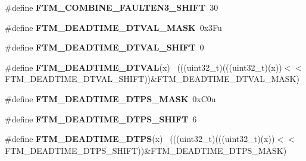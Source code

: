 \begin{DoxyCompactItemize}
\item 
\hypertarget{group___f_t_m___register___masks_ga85e6b9e11f73ef2ae12870399dbc99a6}{}\#define {\bfseries F\+T\+M\+\_\+\+C\+O\+M\+B\+I\+N\+E\+\_\+\+F\+A\+U\+L\+T\+E\+N3\+\_\+\+S\+H\+I\+F\+T}~30\label{group___f_t_m___register___masks_ga85e6b9e11f73ef2ae12870399dbc99a6}

\item 
\hypertarget{group___f_t_m___register___masks_ga8fdaa69c3721ec4a328fadcc00d4f4df}{}\#define {\bfseries F\+T\+M\+\_\+\+D\+E\+A\+D\+T\+I\+M\+E\+\_\+\+D\+T\+V\+A\+L\+\_\+\+M\+A\+S\+K}~0x3\+Fu\label{group___f_t_m___register___masks_ga8fdaa69c3721ec4a328fadcc00d4f4df}

\item 
\hypertarget{group___f_t_m___register___masks_ga40e02c81ec12ef23c0ce633feaf03d1a}{}\#define {\bfseries F\+T\+M\+\_\+\+D\+E\+A\+D\+T\+I\+M\+E\+\_\+\+D\+T\+V\+A\+L\+\_\+\+S\+H\+I\+F\+T}~0\label{group___f_t_m___register___masks_ga40e02c81ec12ef23c0ce633feaf03d1a}

\item 
\hypertarget{group___f_t_m___register___masks_gadcf360654b0896d8df246f658874a6d7}{}\#define {\bfseries F\+T\+M\+\_\+\+D\+E\+A\+D\+T\+I\+M\+E\+\_\+\+D\+T\+V\+A\+L}(x)                                    ~(((uint32\+\_\+t)(((uint32\+\_\+t)(x))$<$$<$F\+T\+M\+\_\+\+D\+E\+A\+D\+T\+I\+M\+E\+\_\+\+D\+T\+V\+A\+L\+\_\+\+S\+H\+I\+F\+T))\&F\+T\+M\+\_\+\+D\+E\+A\+D\+T\+I\+M\+E\+\_\+\+D\+T\+V\+A\+L\+\_\+\+M\+A\+S\+K)\label{group___f_t_m___register___masks_gadcf360654b0896d8df246f658874a6d7}

\item 
\hypertarget{group___f_t_m___register___masks_gae0402be742f84b93af5306ac6a61706f}{}\#define {\bfseries F\+T\+M\+\_\+\+D\+E\+A\+D\+T\+I\+M\+E\+\_\+\+D\+T\+P\+S\+\_\+\+M\+A\+S\+K}~0x\+C0u\label{group___f_t_m___register___masks_gae0402be742f84b93af5306ac6a61706f}

\item 
\hypertarget{group___f_t_m___register___masks_gaa42cc1f2612186f882762059b910cd7a}{}\#define {\bfseries F\+T\+M\+\_\+\+D\+E\+A\+D\+T\+I\+M\+E\+\_\+\+D\+T\+P\+S\+\_\+\+S\+H\+I\+F\+T}~6\label{group___f_t_m___register___masks_gaa42cc1f2612186f882762059b910cd7a}

\item 
\hypertarget{group___f_t_m___register___masks_ga9e4c3d2e2eb82663dd9cc86b282c9e7a}{}\#define {\bfseries F\+T\+M\+\_\+\+D\+E\+A\+D\+T\+I\+M\+E\+\_\+\+D\+T\+P\+S}(x)                                      ~(((uint32\+\_\+t)(((uint32\+\_\+t)(x))$<$$<$F\+T\+M\+\_\+\+D\+E\+A\+D\+T\+I\+M\+E\+\_\+\+D\+T\+P\+S\+\_\+\+S\+H\+I\+F\+T))\&F\+T\+M\+\_\+\+D\+E\+A\+D\+T\+I\+M\+E\+\_\+\+D\+T\+P\+S\+\_\+\+M\+A\+S\+K)\label{group___f_t_m___register___masks_ga9e4c3d2e2eb82663dd9cc86b282c9e7a}


\end{DoxyCompactItemize}
